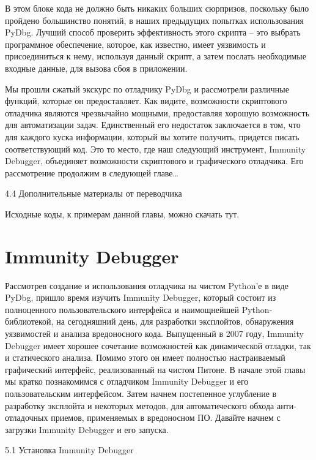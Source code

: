 \documentclass[12pt]{book}
\begin{document}
В этом блоке кода не должно быть никаких больших сюрпризов, поскольку было пройдено большинство понятий, в наших предыдущих попытках использования PyDbg. Лучший способ проверить эффективность этого скрипта – это выбрать программное обеспечение, которое, как известно, имеет уязвимость и присоединиться к нему, используя данный скрипт, а затем послать необходимые входные данные, для вызова сбоя в приложении.

Мы прошли сжатый экскурс по отладчику PyDbg и рассмотрели различные функций, которые он предоставляет. Как видите, возможности скриптового отладчика являются чрезвычайно мощными, предоставляя хорошую возможность для автоматизации задач. Единственный его недостаток заключается в том, что для каждого куска информации, который вы хотите получить, придется писать соответствующий код. Это то место, где наш следующий инструмент, Immunity Debugger, объединяет возможности скриптового и графического отладчика. Его рассмотрение продолжим в следующей главе…


4.4 Дополнительные материалы от переводчика

Исходные коды, к примерам данной главы, можно скачать тут.

\chapter{Immunity Debugger}

Рассмотрев создание и использования отладчика на чистом Python’е в виде PyDbg, пришло время изучить Immunity Debugger, который состоит из полноценного пользовательского интерфейса и наимощнейшей Python-библиотекой, на сегодняшний день, для разработки эксплойтов, обнаружения уязвимостей и анализа вредоносного кода. Выпущенный в 2007 году, Immunity Debugger имеет хорошее сочетание возможностей как динамической отладки, так и статического анализа. Помимо этого он имеет полностью настраиваемый графический интерфейс, реализованный на чистом Питоне. В начале этой главы мы кратко познакомимся с отладчиком Immunity Debugger и его пользовательским интерфейсом. Затем начнем постепенное углубление в разработку эксплойта и некоторых методов, для автоматического обхода анти-отладочных приемов, применяемых в вредоносном ПО. Давайте начнем с загрузки Immunity Debugger и его запуска.


5.1 Установка Immunity Debugger
\end{document}
